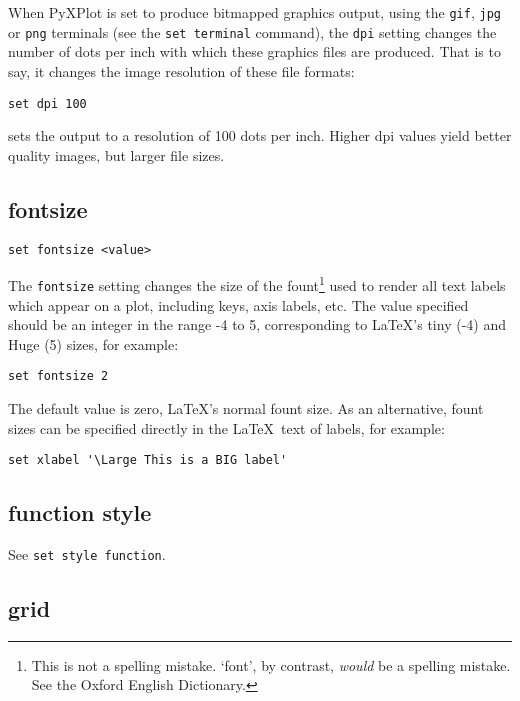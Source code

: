 When PyXPlot is set to produce bitmapped graphics output, using the {\tt gif},
{\tt jpg} or {\tt png} terminals (see the {\tt set terminal} command), the
{\tt dpi} setting changes the number of dots per inch with which these
graphics files are produced. That is to say, it changes the image resolution of
these file formats:

\begin{verbatim}
set dpi 100
\end{verbatim}

\noindent sets the output to a resolution of 100 dots per inch. Higher dpi
values yield better quality images, but larger file sizes.

\subsection{fontsize}

\begin{verbatim}
set fontsize <value>
\end{verbatim}

The {\tt fontsize} setting changes the size of the fount\footnote{This is not a
spelling mistake. `font', by contrast, \textit{would} be a spelling mistake. See the
Oxford English Dictionary.} used to render all text labels which appear on a
plot, including keys, axis labels, etc. The value specified should be an integer
in the range -4 to 5, corresponding to \LaTeX's tiny (-4) and Huge (5) sizes,
for example:

\begin{verbatim}
set fontsize 2
\end{verbatim}

The default value is zero, \LaTeX's normal fount size. As an alternative, fount
sizes can be specified directly in the \LaTeX\ text of labels, for example:

\begin{verbatim}
set xlabel '\Large This is a BIG label'
\end{verbatim}

\subsection{function style}

See {\tt set style function}.

\subsection{grid}

